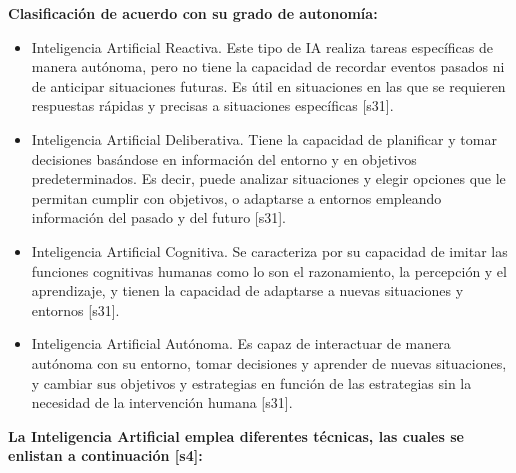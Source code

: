 \textbf{Clasificación de acuerdo con su grado de autonomía:}

\begin{itemize}
    \item Inteligencia Artificial Reactiva. Este tipo de IA realiza tareas específicas de manera autónoma, pero no tiene la capacidad de recordar eventos pasados ni de anticipar situaciones futuras. Es útil en situaciones en las que se requieren respuestas rápidas y precisas a situaciones específicas [s31].\\
\item Inteligencia Artificial Deliberativa. Tiene la capacidad de planificar y tomar decisiones basándose en información del entorno y en objetivos predeterminados. Es decir, puede analizar situaciones y elegir opciones que le permitan cumplir con objetivos, o adaptarse a entornos empleando información del pasado y del futuro [s31].\\

\item Inteligencia Artificial Cognitiva. Se caracteriza por su capacidad de imitar las funciones cognitivas humanas como lo son el razonamiento, la percepción y el aprendizaje, y tienen la capacidad de adaptarse a nuevas situaciones y entornos [s31].\\

\item Inteligencia Artificial Autónoma. Es capaz de interactuar de manera autónoma con su entorno, tomar decisiones y aprender de nuevas situaciones, y cambiar sus objetivos y estrategias en función de las estrategias sin la necesidad de la intervención humana [s31].

\end{itemize}

\textbf{La Inteligencia Artificial emplea diferentes técnicas, las cuales se enlistan a continuación [s4]:}

